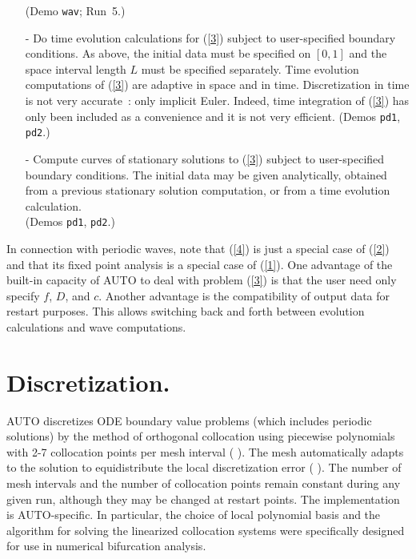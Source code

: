 \documentclass[12pt]{report}
\begin{document}
\begin{itemize}
  (Demo {\tt wav}; Run~5.)
\item[-]
  Do time evolution calculations for (\ref{3}) subject to user-specified
  boundary conditions.
  As above, the initial data must be specified on $[0,1]$ and the space
  interval length $L$ must be specified separately.
  Time evolution computations of (\ref{3}) are adaptive in space and
  in time. Discretization in time is not very accurate~: only
  implicit Euler. Indeed, time integration of (\ref{3}) has only been
  included as a convenience and it is not very efficient.
  (Demos {\tt pd1}, {\tt pd2}.)
\item[-]
  Compute curves of stationary solutions to (\ref{3}) subject to user-specified
  boundary conditions.
  The initial data may be given analytically, obtained from a previous 
  stationary solution computation, or from a time evolution calculation.\\
  (Demos {\tt pd1}, {\tt pd2}.)
\end{itemize}
 
In connection with periodic waves,
note that (\ref{4}) is just a special case of (\ref{2}) and
that its fixed point analysis is a special case of (\ref{1}).
One advantage of the built-in capacity of {\cal AUTO} to deal with
problem (\ref{3}) is that the user need only specify $f$, $D$, and $c$.
Another advantage is the compatibility of output data for
restart purposes. This allows switching back and forth between
evolution calculations and wave computations.

\section{ Discretization.} \label{sec:Discretization}
  {\cal AUTO} discretizes ODE boundary value problems
  (which includes periodic solutions) by the method of orthogonal 
  collocation using piecewise polynomials with 2-7 collocation points 
  per mesh interval ( \citeyear{dBSw:73}).
  The mesh automatically adapts to the solution to equidistribute
  the local discretization error ( \citeyear{RuCr:78}).
  The number of mesh intervals and the number of collocation points
  remain constant during any given run, although they may be changed 
  at restart points.
  The implementation is {\cal AUTO}-specific. In particular, the choice of
  local polynomial basis
  and the algorithm for solving the linearized collocation systems
  were specifically designed for use in numerical bifurcation analysis.
  
\end{document}
